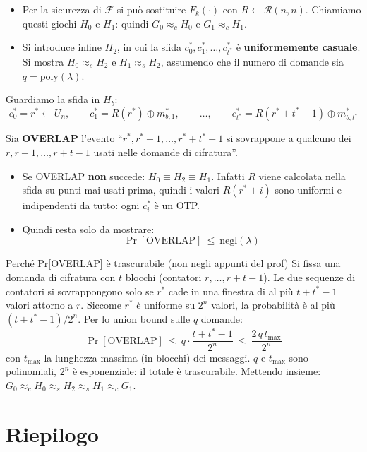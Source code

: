 \begin{itemize}
  \item Per la sicurezza di \(\mathcal{F}\) si può sostituire \(F_k(\cdot)\) con \(R \leftarrow \mathcal{R}(n, n)\). Chiamiamo questi giochi \(H_0\) e \(H_1\): quindi \(G_0 \approx_c H_0\) e \(G_1 \approx_c H_1\).
  \item Si introduce infine \(H_2\), in cui la sfida \(c_0^*, c_1^*, \dots, c_{t^*}^*\) è \textbf{uniformemente casuale}. Si mostra \(H_0 \approx_s H_2\) e \(H_1 \approx_s H_2\), assumendo che il numero di domande sia \(q = \text{poly}(\lambda)\).
\end{itemize}

Guardiamo la sfida in \(H_b\):
\[
c_0^* = r^* \leftarrow U_n, \qquad c_1^* = R(r^*) \oplus m_{b,1}^*, \qquad \dots, \qquad c_{t^*}^* = R(r^* + t^* - 1) \oplus m_{b, t^*}^*
\]

Sia \textbf{OVERLAP} l'evento ``\(r^*, r^* + 1, \dots, r^* + t^* - 1\) si sovrappone a qualcuno dei \(r, r+1, \dots, r + t - 1\) usati nelle domande di cifratura''.
\begin{itemize}
  \item Se OVERLAP \textbf{non} succede: \(H_0 \equiv H_2 \equiv H_1\). Infatti \(R\) viene calcolata nella sfida su punti mai usati prima, quindi i valori \(R(r^* + i)\) sono uniformi e indipendenti da tutto: ogni \(c_i^*\) è un OTP.
  \item Quindi resta solo da mostrare:
  \[
  \Pr[\text{OVERLAP}] \ \le\ \text{negl}(\lambda)
  \]
\end{itemize}

\begin{approfondimento}{Perché Pr[OVERLAP] è trascurabile (non negli appunti del prof)}
Si fissa una domanda di cifratura con \(t\) blocchi (contatori \(r, \dots, r + t - 1\)). Le due sequenze di contatori si sovrappongono solo se \(r^*\) cade in una finestra di al più \(t + t^* - 1\) valori attorno a \(r\). Siccome \(r^*\) è uniforme su \(2^n\) valori, la probabilità è al più \((t + t^* - 1)/2^n\). Per lo union bound sulle \(q\) domande:
\[
\Pr[\text{OVERLAP}] \ \le\ q \cdot \frac{t + t^* - 1}{2^n} \ \le\ \frac{2\, q\, t_{\max}}{2^n}
\]
con \(t_{\max}\) la lunghezza massima (in blocchi) dei messaggi. \(q\) e \(t_{\max}\) sono polinomiali, \(2^n\) è esponenziale: il totale è trascurabile. Mettendo insieme: \(G_0 \approx_c H_0 \approx_s H_2 \approx_s H_1 \approx_c G_1\).
\end{approfondimento}

\section{Riepilogo}

